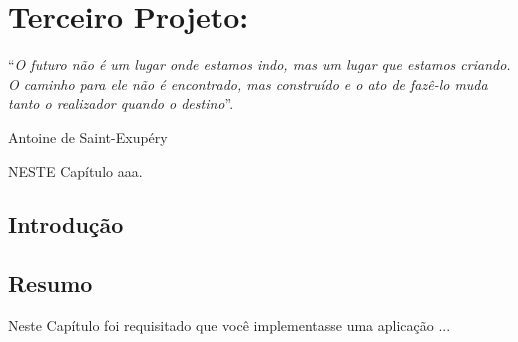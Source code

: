 \chapter{Terceiro Projeto: }\label{cap:terceiroProjeto}
\epigraph{``\textit{O futuro não é um lugar onde estamos indo, mas um lugar que estamos criando. O caminho para ele não é encontrado, mas construído e o ato de fazê-lo muda tanto o realizador quando o destino}''.}{Antoine de Saint-Exupéry}

\lettrine[lines=4, lhang=0.1, lraise=0, loversize=0.2, findent=0.1em]{\textcolor{corTema}{N}}{ESTE} Capítulo aaa.

\vfill

\section{Introdução}



\section{Resumo}

Neste Capítulo foi requisitado que você implementasse uma aplicação ...
